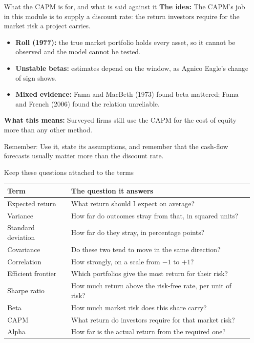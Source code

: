 \documentclass[10pt,aspectratio=169]{beamer}
\newcommand{\idea}[1]{\textbf{The idea:} #1\par\smallskip}
\newcommand{\inpractice}[1]{\par\smallskip\textbf{What this means:} #1}
\newcommand{\remember}[1]{\par\smallskip\alert{Remember:} #1}
\begin{document}
\begin{frame}{What the CAPM is for, and what is said against it}
\idea{The CAPM's job in this module is to supply a discount rate: the return investors require for the market risk a project carries.}
\begin{itemize}
\item \textbf{Roll (1977):} the true market portfolio holds every asset, so it cannot be observed and the model cannot be tested.
\item \textbf{Unstable betas:} estimates depend on the window, as Agnico Eagle's change of sign shows.
\item \textbf{Mixed evidence:} Fama and MacBeth (1973) found beta mattered; Fama and French (2006) found the relation unreliable.
\end{itemize}
\inpractice{Surveyed firms still use the CAPM for the cost of equity more than any other method.}
\remember{Use it, state its assumptions, and remember that the cash-flow forecasts usually matter more than the discount rate.}
\end{frame}

\begin{frame}{Keep these questions attached to the terms}
\par\smallskip\begingroup\centering
\begin{tabular}{lp{}}
\toprule Term & The question it answers\\\midrule
Expected return & What return should I expect on average?\\[0.2em]
Variance & How far do outcomes stray from that, in squared units?\\[0.2em]
Standard deviation & How far do they stray, in percentage points?\\[0.2em]
Covariance & Do these two tend to move in the same direction?\\[0.2em]
Correlation & How strongly, on a scale from $-1$ to $+1$?\\[0.2em]
Efficient frontier & Which portfolios give the most return for their risk?\\[0.2em]
Sharpe ratio & How much return above the risk-free rate, per unit of risk?\\[0.2em]
Beta & How much market risk does this share carry?\\[0.2em]
CAPM & What return do investors require for that market risk?\\[0.2em]
Alpha & How far is the actual return from the required one?\\\bottomrule
\end{tabular}
\par\endgroup\smallskip
\end{frame}
\end{document}
